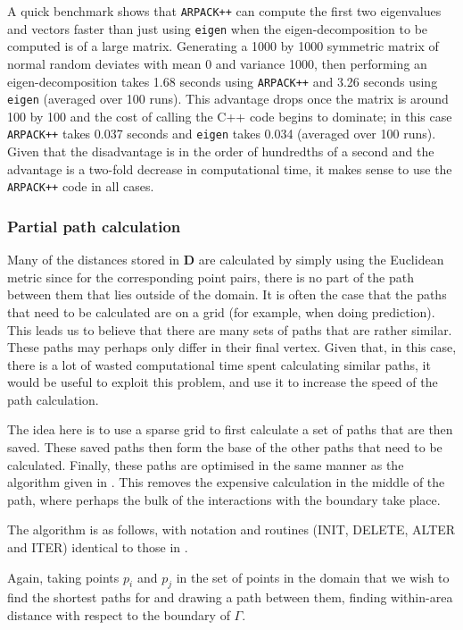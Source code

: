 A quick benchmark shows that \texttt{ARPACK++} can compute the first two eigenvalues and vectors faster than just using \texttt{eigen} when the eigen-decomposition to be computed is of a large matrix. Generating a 1000 by 1000 symmetric matrix of normal random deviates with mean 0 and variance 1000, then performing an eigen-decomposition takes 1.68 seconds using \texttt{ARPACK++} and 3.26 seconds using \texttt{eigen} (averaged over 100 runs). This advantage drops once the matrix is around 100 by 100 and the cost of calling the C++ code begins to dominate; in this case \texttt{ARPACK++} takes 0.037 seconds and \texttt{eigen} takes 0.034 (averaged over 100 runs). Given that the disadvantage is in the order of hundredths of a second and the advantage is a two-fold decrease in computational time, it makes sense to use the \texttt{ARPACK++} code in all cases.


\subsubsection{Partial path calculation}

Many of the distances stored in $\mathbf{D}$ are calculated by simply using the Euclidean metric since for the corresponding point pairs, there is no part of the path between them that lies outside of the domain. It is often the case that the paths that need to be calculated are on a grid (for example, when doing prediction). This leads us to believe that there are many sets of paths that are rather similar. These paths may perhaps only differ in their final vertex. Given that, in this case, there is a lot of wasted computational time spent calculating similar paths, it would be useful to exploit this problem, and use it to increase the speed of the path calculation.

The idea here is to use a sparse grid to first calculate a set of paths that are then saved. These saved paths then form the base of the other paths that need to be calculated. Finally, these paths are optimised in the same manner as the algorithm given in . This removes the expensive calculation in the middle of the path, where perhaps the bulk of the interactions with the boundary take place.

The algorithm is as follows, with notation and routines (INIT, DELETE, ALTER and ITER) identical to those in . 

Again, taking points $p_i$ and $p_j$ in the set of points in the domain that we wish to find the shortest paths for and drawing a path between them, finding within-area distance with respect to the boundary of $\Gamma$.

